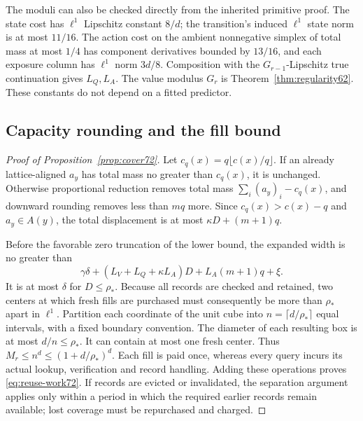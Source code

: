 The moduli can also be checked directly from the inherited primitive proof. The state cost has $\ell^1$ Lipschitz constant $8/d$; the transition's induced $\ell^1$ state norm is at most $11/16$. The action cost on the ambient nonnegative simplex of total mass at most $1/4$ has component derivatives bounded by $13/16$, and each exposure column has $\ell^1$ norm $3d/8$. Composition with the $G_{r-1}$-Lipschitz true continuation gives $L_Q,L_A$. The value modulus $G_r$ is Theorem~\ref{thm:regularity62}. These constants do not depend on a fitted predictor.

\subsection{Capacity rounding and the fill bound}\label{supp:cover72}
\begin{proof}[Proof of Proposition~\ref{prop:cover72}]
Let $c_q(x)=q\lfloor c(x)/q\rfloor$. If an already lattice-aligned $a_y$ has total mass no greater than $c_q(x)$, it is unchanged. Otherwise proportional reduction removes total mass $\sum_i(a_y)_i-c_q(x)$, and downward rounding removes less than $mq$ more. Since $c_q(x)>c(x)-q$ and $a_y\in A(y)$, the total displacement is at most $\kappa D+(m+1)q$.

Before the favorable zero truncation of the lower bound, the expanded width is no greater than
\[
 \gamma\delta+(L_V+L_Q+\kappa L_A)D+L_A(m+1)q+\xi.
\]
It is at most $\delta$ for $D\le\rho_*$. Because all records are checked and retained, two centers at which fresh fills are purchased must consequently be more than $\rho_*$ apart in $\ell^1$. Partition each coordinate of the unit cube into $n=\lceil d/\rho_*\rceil$ equal intervals, with a fixed boundary convention. The diameter of each resulting box is at most $d/n\le\rho_*$. It can contain at most one fresh center. Thus $M_r\le n^d\le(1+d/\rho_*)^d$. Each fill is paid once, whereas every query incurs its actual lookup, verification and record handling. Adding these operations proves \eqref{eq:reuse-work72}. If records are evicted or invalidated, the separation argument applies only within a period in which the required earlier records remain available; lost coverage must be repurchased and charged.
\end{proof}
